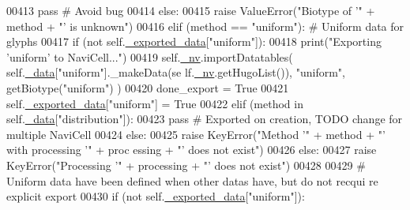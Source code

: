 \begin{DoxyCode}
00413                     \textcolor{keywordflow}{pass} \textcolor{comment}{# Avoid bug}
00414                 \textcolor{keywordflow}{else}:
00415                     \textcolor{keywordflow}{raise} ValueError(\textcolor{stringliteral}{"Biotype of '"} + method + \textcolor{stringliteral}{"' is unknown"})
00416             \textcolor{keywordflow}{elif} (method == \textcolor{stringliteral}{"uniform"}): \textcolor{comment}{# Uniform data for glyphs}
00417                 \textcolor{keywordflow}{if} (\textcolor{keywordflow}{not} self.\hyperlink{classnavicom_1_1navicom_1_1NaviCom_ab7328fbbe89a1b3cb2db8c3d456d958f}{_exported_data}[\textcolor{stringliteral}{"uniform"}]):
00418                     \textcolor{keywordflow}{print}(\textcolor{stringliteral}{"Exporting 'uniform'  to NaviCell..."})
00419                     self.\hyperlink{classnavicom_1_1navicom_1_1NaviCom_afff3fd56fa16a68bab52ba8d801e325a}{_nv}.importDatatables( self.\hyperlink{classnavicom_1_1navicom_1_1NaviCom_a407b2b5c30a5652ee85c4be54b3e6679}{_data}[\textcolor{stringliteral}{"uniform"}].\_makeData(se
      lf.\hyperlink{classnavicom_1_1navicom_1_1NaviCom_afff3fd56fa16a68bab52ba8d801e325a}{_nv}.getHugoList()), \textcolor{stringliteral}{"uniform"}, getBiotype(\textcolor{stringliteral}{"uniform"}) )
00420                     done\_export = \textcolor{keyword}{True}
00421                     self.\hyperlink{classnavicom_1_1navicom_1_1NaviCom_ab7328fbbe89a1b3cb2db8c3d456d958f}{_exported_data}[\textcolor{stringliteral}{"uniform"}] = \textcolor{keyword}{True}
00422             \textcolor{keywordflow}{elif} (method \textcolor{keywordflow}{in} self.\hyperlink{classnavicom_1_1navicom_1_1NaviCom_a407b2b5c30a5652ee85c4be54b3e6679}{_data}[\textcolor{stringliteral}{"distribution"}]):
00423                 \textcolor{keywordflow}{pass} \textcolor{comment}{# Exported on creation, TODO change for multiple NaviCell}
00424             \textcolor{keywordflow}{else}:
00425                 \textcolor{keywordflow}{raise} KeyError(\textcolor{stringliteral}{"Method '"} + method + \textcolor{stringliteral}{"' with processing '"} + proc
      essing + \textcolor{stringliteral}{"' does not exist"})
00426         \textcolor{keywordflow}{else}:
00427             \textcolor{keywordflow}{raise} KeyError(\textcolor{stringliteral}{"Processing '"} + processing + \textcolor{stringliteral}{"' does not exist"})
00428 
00429         \textcolor{comment}{# Uniform data have been defined when other datas have, but do not recqui
      re explicit export}
00430         \textcolor{keywordflow}{if} (\textcolor{keywordflow}{not} self.\hyperlink{classnavicom_1_1navicom_1_1NaviCom_ab7328fbbe89a1b3cb2db8c3d456d958f}{_exported_data}[\textcolor{stringliteral}{"uniform"}]):

\end{DoxyCode}
